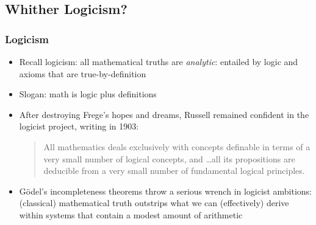 \subsection{Whither Logicism?}


\begin{frame}
\frametitle{Logicism}

\begin{itemize}[<+->]

\item Recall logicism: all mathematical truths are \textit{analytic}: entailed by logic and axioms that are true-by-definition 
\item[] Slogan: math is logic plus definitions 

\item After destroying Frege's hopes and dreams, Russell remained confident in the logicist project, writing in 1903:

\pause 
\begin{quotation}
All mathematics deals exclusively with concepts definable in terms of a very small number of logical concepts, and \dots all its propositions are deducible from a very small number of fundamental logical principles.
\end{quotation}


\item G\"odel's incompleteness theorems throw a serious wrench in logicist ambitions: (classical) mathematical truth outstrips what we can (effectively) derive within systems that contain a modest amount of arithmetic

\end{itemize}
\end{frame}

